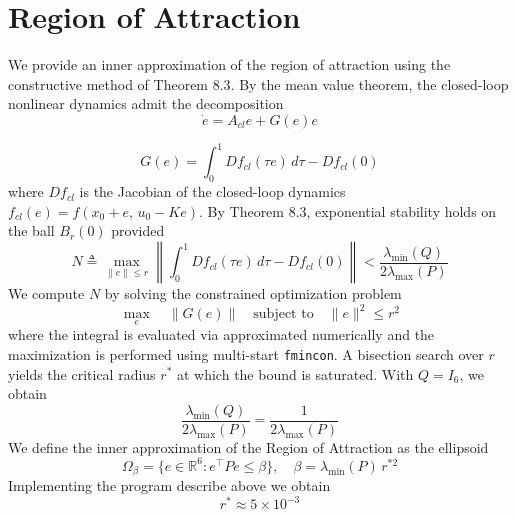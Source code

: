 \section{\textbf{Region of Attraction}}
\noindent We provide an inner approximation of the region of attraction using the constructive method of Theorem 8.3. By the mean value theorem, the closed-loop nonlinear dynamics admit the decomposition
\[ \dot{e} = A_{cl}e + G(e)e\]

\[ G(e) = \int_0^1 Df_{cl}(\tau e)\,d\tau - Df_{cl}(0) \]
\noindent where $Df_{cl}$ is the Jacobian of the closed-loop dynamics $f_{cl}(e) = f(x_0 + e,\, u_0 - Ke)$. By Theorem 8.3, exponential stability holds on the ball $B_r(0)$ provided
\[ N \triangleq \max_{\|e\| \leq r} \left\| \int_0^1 Df_{cl}(\tau e)\,d\tau - Df_{cl}(0) \right\| < \frac{\lambda_{\min}(Q)}{2\lambda_{\max}(P)} \]
\noindent We compute $N$ by solving the constrained optimization problem
\[ \max_{e} \quad \|G(e)\| \quad \text{subject to} \quad \|e\|^2 \leq r^2 \]
\noindent where the integral is evaluated via approximated numerically and the maximization is performed using multi-start \texttt{fmincon}. A bisection search over $r$ yields the critical radius $r^*$ at which the bound is saturated. With $Q = I_6$, we obtain
\[ \frac{\lambda_{\min}(Q)}{2\lambda_{\max}(P)} = \frac{1}{2\lambda_{\max}(P)} \]
\noindent We define the inner approximation of the Region of Attraction as the ellipsoid
\[ \Omega_\beta = \{ e \in \mathbb{R}^6 : e^\top P e \leq \beta \}, \quad \beta = \lambda_{\min}(P)\, r^{*2} \]
\noindent Implementing the program describe above we obtain
\[r^* \approx 5 \times 10^{-3} \]